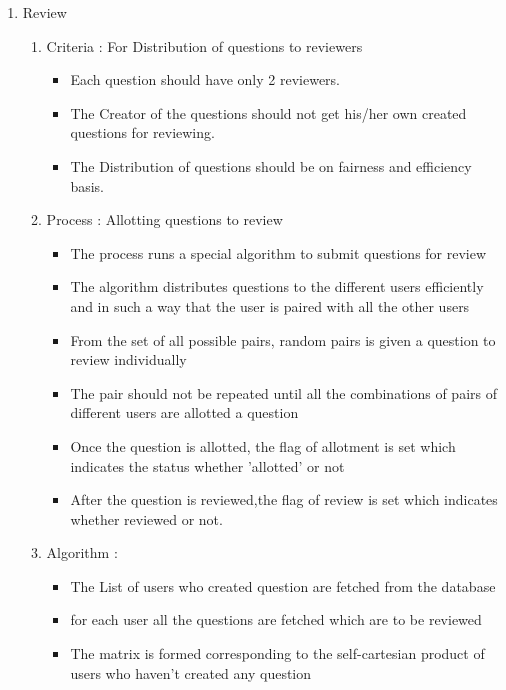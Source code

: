 \documentclass[a4paper,12pt,oneside]{book}
\begin{document}
\begin{enumerate}
        \item Review
            \begin{enumerate}
                \item Criteria : For Distribution of questions to reviewers
                \begin{itemize}
                    \item Each question should have only 2 reviewers.
                    \item  The Creator of the questions should not get his/her own created questions for reviewing.
                    \item  The Distribution of questions should be on fairness and efficiency basis.
                \end{itemize}
            \item Process : Allotting questions to review
                \begin{itemize}
                    \item  The process runs a special algorithm to submit questions for review 
                    \item  The algorithm distributes questions to the different users efficiently and in such a way that the user is paired with all the other users
                    \item  From the set of all possible pairs, random pairs is given a question to review individually
                    \item The pair should not be repeated until all the combinations of pairs of different users are allotted a question
                    \item Once the question is allotted, the flag of allotment is set which indicates the status whether 'allotted' or not
                    \item After the question is reviewed,the flag of review is set which indicates whether reviewed or not.
                \end{itemize}
            \item Algorithm :
                \begin{itemize}
                    \item The List of users who created question are fetched from the database 
                    \item for each user all the questions are fetched which are to be reviewed
                    \item The matrix is formed corresponding to the self-cartesian product of users who haven't created any question

\end{itemize}
\end{enumerate}
\end{enumerate}
\end{document}
